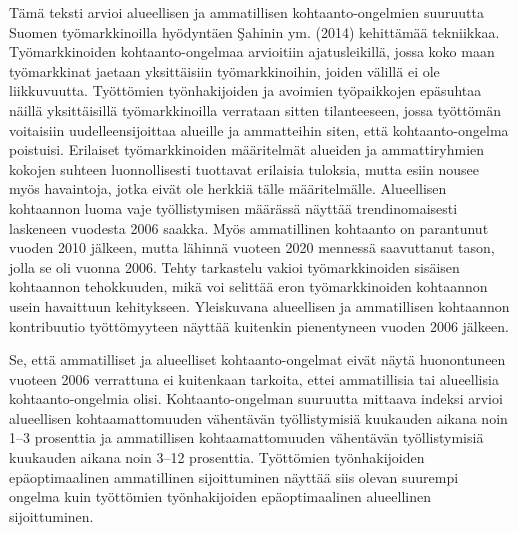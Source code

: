 \documentclass[12pt]{article}
\begin{document}
Tämä teksti arvioi alueellisen ja ammatillisen kohtaanto-ongelmien suuruutta Suomen työmarkkinoilla hyödyntäen Şahinin ym. (2014) kehittämää tekniikkaa. Työmarkkinoiden kohtaanto-ongelmaa arvioitiin ajatusleikillä, jossa koko maan työmarkkinat jaetaan yksittäisiin työmarkkinoihin, joiden välillä ei ole liikkuvuutta. Työttömien työnhakijoiden ja avoimien työpaikkojen epäsuhtaa näillä yksittäisillä työmarkkinoilla verrataan sitten tilanteeseen, jossa työttömän voitaisiin uudelleensijoittaa alueille ja ammatteihin siten, että kohtaanto-ongelma poistuisi. Erilaiset työmarkkinoiden määritelmät alueiden ja ammattiryhmien kokojen suhteen luonnollisesti tuottavat erilaisia tuloksia, mutta esiin nousee myös havaintoja, jotka eivät ole herkkiä tälle määritelmälle. Alueellisen kohtaannon luoma vaje työllistymisen määrässä näyttää trendinomaisesti laskeneen vuodesta 2006 saakka. Myös ammatillinen kohtaanto on parantunut vuoden 2010 jälkeen, mutta lähinnä vuoteen 2020 mennessä saavuttanut tason, jolla se oli vuonna 2006. Tehty tarkastelu vakioi työmarkkinoiden sisäisen kohtaannon tehokkuuden, mikä voi selittää eron työmarkkinoiden kohtaannon usein havaittuun kehitykseen. Yleiskuvana alueellisen ja ammatillisen kohtaannon kontribuutio työttömyyteen näyttää kuitenkin pienentyneen vuoden 2006 jälkeen.

Se, että ammatilliset ja alueelliset kohtaanto-ongelmat eivät näytä huonontuneen vuoteen 2006 verrattuna ei kuitenkaan tarkoita, ettei ammatillisia tai alueellisia kohtaanto-ongelmia olisi. Kohtaanto-ongelman suuruutta mittaava indeksi arvioi alueellisen kohtaamattomuuden vähentävän työllistymisiä kuukauden aikana noin 1–3 prosenttia ja ammatillisen kohtaamattomuuden vähentävän työllistymisiä kuukauden aikana noin 3–12 prosenttia. Työttömien työnhakijoiden epäoptimaalinen ammatillinen sijoittuminen näyttää siis olevan suurempi ongelma kuin työttömien työnhakijoiden epäoptimaalinen alueellinen sijoittuminen. 


 

\end{document}
